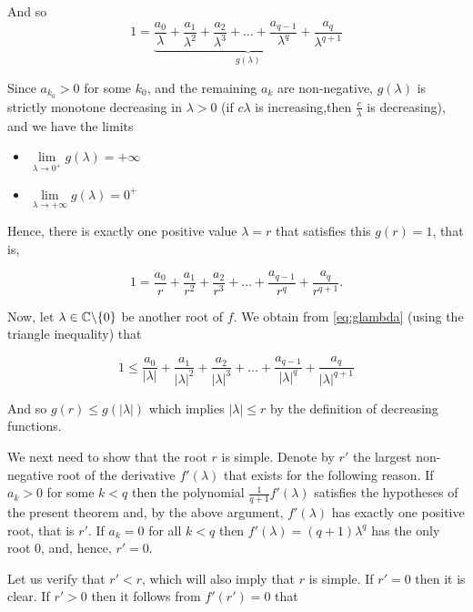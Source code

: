 \begin{theorem}
\begin{pf}
\begin{enumerate}[(a)]
And so
\begin{equation} \label{eq:glambda}
1 =\underbrace{\frac{a_0}{\lambda} + \frac{a_1}{\lambda^2} + \frac{a_2}{\lambda^3}+\dots + \frac{a_{q-1}}{\lambda^q} +\frac{a_q}{\lambda^{q+1}}}_{g(\lambda)}    
\end{equation}

Since $a_{k_0} > 0$ for some $k_0$, and the remaining $a_k$ are non-negative, $g(\lambda)$ is strictly monotone decreasing in $\lambda > 0$ (if $c\lambda$ is increasing,then $\frac{c}\lambda$ is decreasing),  and we have the limits
\begin{itemize}
    \item $\lim\limits_{\lambda\to0^+}g(\lambda)=+\infty$
    \item $\lim\limits_{\lambda\to+\infty}g(\lambda)=0^+$
\end{itemize}

Hence, there is exactly one positive value $\lambda = r$ that satisfies this $g(r) = 1$, that is,

$$1 =\frac{a_0}{r} + \frac{a_1}{r^2} + \frac{a_2}{r^3}+\dots + \frac{a_{q-1}}{r^q} +\frac{a_q}{r^{q+1}}.$$

Now, let $\lambda\in \mathbb C \backslash \{0\}$ be another root of $f$. We obtain from \ref{eq:glambda} (using the triangle inequality) that

$$1\leq \frac{a_0}{|\lambda|} + \frac{a_1}{|\lambda|^2} + \frac{a_2}{|\lambda|^3}+\dots + \frac{a_{q-1}}{|\lambda|^q} +\frac{a_q}{|\lambda|^{q+1}}$$

And so $g(r)\leq g(|\lambda|)$ which implies $|\lambda|\leq r$ by the definition of decreasing functions.

We next need to show that the root $r$ is simple. Denote by $r'$ the largest non-negative root of the
derivative $f'(\lambda)$ that exists for the following reason. If $a_k > 0$ for some $k < q$ then the
polynomial $\frac{1}{q+1} f'(\lambda)$ satisfies the hypotheses of the present theorem and, by the above
argument, $f'(\lambda)$ has exactly one positive root, that is $r'$. If $a_k = 0$ for all $k < q$ then
$f'(\lambda) = (q + 1) \lambda^q$ has the only root $0$, and, hence, $r' = 0$. 

Let us verify that $r' < r$, which will also imply that $r$ is simple. If $r' = 0$ then it is clear. If $r' > 0$ then it follows
from $f'(r') = 0$ that


\end{enumerate}
\end{pf}
\end{theorem}
